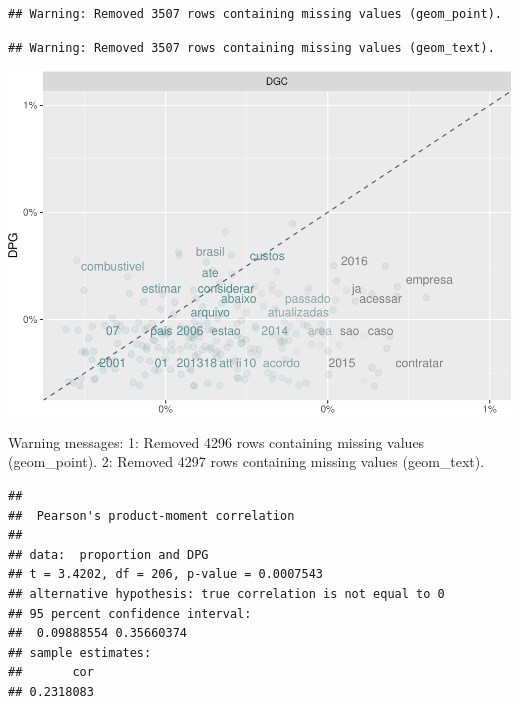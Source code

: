\documentclass[]{article}
\newenvironment{Shaded}{\begin{snugshade}}{\end{snugshade}}
\newcommand{\KeywordTok}[1]{\textcolor[rgb]{0.13,0.29,0.53}{\textbf{#1}}}
\newcommand{\DataTypeTok}[1]{\textcolor[rgb]{0.13,0.29,0.53}{#1}}
\newcommand{\StringTok}[1]{\textcolor[rgb]{0.31,0.60,0.02}{#1}}
\newcommand{\FunctionTok}[1]{\textcolor[rgb]{0.00,0.00,0.00}{#1}}
\newcommand{\OperatorTok}[1]{\textcolor[rgb]{0.81,0.36,0.00}{\textbf{#1}}}
\newcommand{\AttributeTok}[1]{\textcolor[rgb]{0.77,0.63,0.00}{#1}}
\newcommand{\NormalTok}[1]{#1}
\begin{document}
\begin{verbatim}
## Warning: Removed 3507 rows containing missing values (geom_point).
\end{verbatim}

\begin{verbatim}
## Warning: Removed 3507 rows containing missing values (geom_text).
\end{verbatim}

\includegraphics{markdown_v30_files/figure-latex/unnamed-chunk-67-1.pdf}

\begin{Shaded}
\begin{Highlighting}[]
\FunctionTok{Warning messages:}
\FunctionTok{1:}\AttributeTok{ Removed 4296 rows containing missing values (geom_point). }
\FunctionTok{2:}\AttributeTok{ Removed 4297 rows containing missing values (geom_text). }
\end{Highlighting}
\end{Shaded}

\begin{Shaded}
\end{Shaded}

\begin{verbatim}
## 
##  Pearson's product-moment correlation
## 
## data:  proportion and DPG
## t = 3.4202, df = 206, p-value = 0.0007543
## alternative hypothesis: true correlation is not equal to 0
## 95 percent confidence interval:
##  0.09888554 0.35660374
## sample estimates:
##       cor 
## 0.2318083
\end{verbatim}
\end{document}
